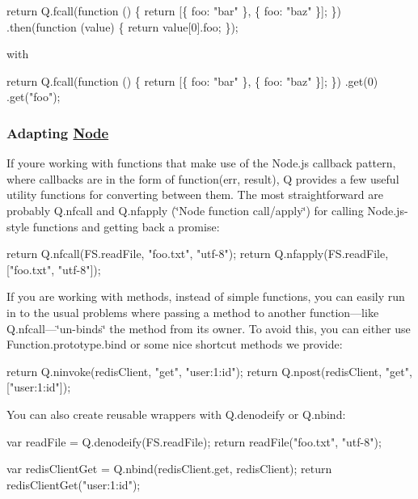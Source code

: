 \begin{DoxyCode}
return Q.fcall(function () \{
    return [\{ foo: "bar" \}, \{ foo: "baz" \}];
\})
.then(function (value) \{
    return value[0].foo;
\});
\end{DoxyCode}


with


\begin{DoxyCode}
return Q.fcall(function () \{
    return [\{ foo: "bar" \}, \{ foo: "baz" \}];
\})
.get(0)
.get("foo");
\end{DoxyCode}


\subsubsection*{Adapting \mbox{\hyperlink{classNode}{Node}}}

If you\textquotesingle{}re working with functions that make use of the Node.\+js callback pattern, where callbacks are in the form of {\ttfamily function(err, result)}, Q provides a few useful utility functions for converting between them. The most straightforward are probably {\ttfamily Q.\+nfcall} and {\ttfamily Q.\+nfapply} (\char`\"{}\+Node function call/apply\char`\"{}) for calling Node.\+js-\/style functions and getting back a promise\+:


\begin{DoxyCode}
return Q.nfcall(FS.readFile, "foo.txt", "utf-8");
return Q.nfapply(FS.readFile, ["foo.txt", "utf-8"]);
\end{DoxyCode}


If you are working with methods, instead of simple functions, you can easily run in to the usual problems where passing a method to another function—like {\ttfamily Q.\+nfcall}—\char`\"{}un-\/binds\char`\"{} the method from its owner. To avoid this, you can either use {\ttfamily Function.\+prototype.\+bind} or some nice shortcut methods we provide\+:


\begin{DoxyCode}
return Q.ninvoke(redisClient, "get", "user:1:id");
return Q.npost(redisClient, "get", ["user:1:id"]);
\end{DoxyCode}


You can also create reusable wrappers with {\ttfamily Q.\+denodeify} or {\ttfamily Q.\+nbind}\+:


\begin{DoxyCode}
var readFile = Q.denodeify(FS.readFile);
return readFile("foo.txt", "utf-8");

var redisClientGet = Q.nbind(redisClient.get, redisClient);
return redisClientGet("user:1:id");
\end{DoxyCode}


